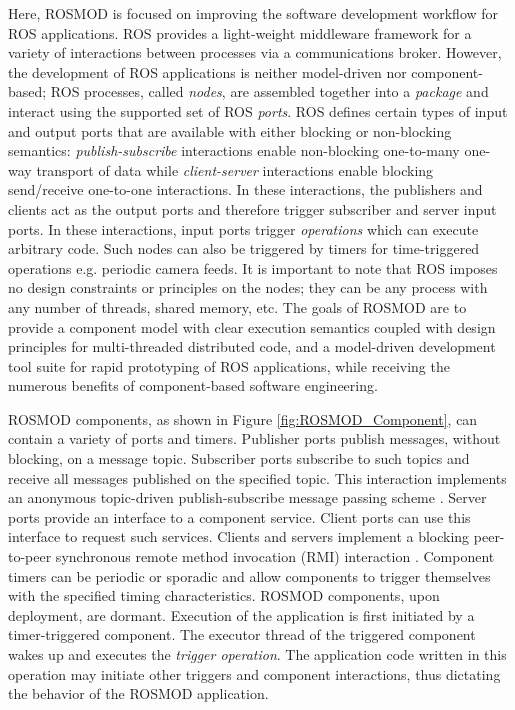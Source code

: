 Here, ROSMOD is focused on improving the software development workflow
for ROS applications. ROS provides a light-weight middleware framework
for a variety of interactions between processes via a communications
broker. However, the development of ROS applications is neither
model-driven nor component-based; ROS processes, called \emph{nodes},
are assembled together into a \emph{package} and interact using the
supported set of ROS \emph{ports}. ROS defines certain types of input
and output ports that are available with either blocking or
non-blocking semantics: \emph{publish-subscribe} interactions enable
non-blocking one-to-many one-way transport of data while
\emph{client-server} interactions enable blocking send/receive
one-to-one interactions. In these interactions, the publishers and
clients act as the output ports and therefore trigger subscriber and
server input ports.  In these interactions, input ports trigger
\emph{operations} which can execute arbitrary code.  Such nodes can
also be triggered by timers for time-triggered operations
e.g. periodic camera feeds. It is important to note that ROS imposes
no design constraints or principles on the nodes; they can be any
process with any number of threads, shared memory, etc.  The goals of
ROSMOD are to provide a component model with clear execution semantics
coupled with design principles for multi-threaded distributed code,
and a model-driven development tool suite for rapid prototyping of ROS
applications, while receiving the numerous benefits of component-based
software engineering.

ROSMOD components, as shown in Figure \ref{fig:ROSMOD_Component}, can
contain a variety of ports and timers. Publisher ports publish
messages, without blocking, on a message topic. Subscriber ports
subscribe to such topics and receive all messages published on the
specified topic. This interaction implements an anonymous topic-driven
publish-subscribe message passing scheme
\cite{Eugster:2003:MFP:857076.857078}. Server ports provide an
interface to a component service. Client ports can use this interface
to request such services. Clients and servers implement a blocking
peer-to-peer synchronous remote method invocation (RMI) interaction
\cite{1008032}. Component timers can be periodic or sporadic and
allow components to trigger themselves with the specified timing
characteristics. ROSMOD components, upon deployment, are
dormant. Execution of the application is first initiated by a
timer-triggered component. The executor thread of the triggered
component wakes up and executes the \emph{trigger operation}. The
application code written in this operation may initiate other triggers
and component interactions, thus dictating the behavior of the ROSMOD
application.

